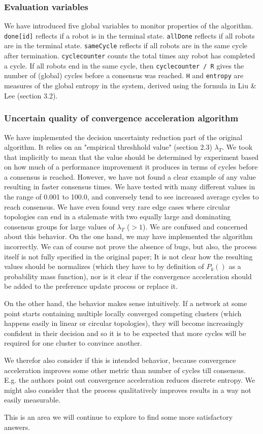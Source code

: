 \subsubsection{Evaluation variables}

We have introduced five global variables to monitor properties of the algorithm.
\texttt{done[id]} reflects if a robot is in the terminal state. \texttt{allDone} reflects if all robots are in the terminal state. \texttt{sameCycle} reflects if all robots are in the same cycle after termination. \texttt{cyclecounter} counts the total times any robot has completed a cycle. If all robots end in the same cycle, then \texttt{cyclecounter / R} gives the number of (global) cycles before a consensus was reached.
\texttt{H} and \texttt{entropy} are measures of the global entropy in the system, derived using the formula in Liu \& Lee (section 3.2).

\subsubsection{Uncertain quality of convergence acceleration algorithm}

We have implemented the decision uncertainty reduction part of the original algorithm.
It relies on an "empirical threshhold value" (section 2.3) $\lambda_T$.
We took that implicitly to mean that the value should be determined by experiment based on how much of a performance improvement it produces in terms of cycles before a consensus is reached. However, we have not found a clear example of any value resulting in faster consensus times. We have tested with many different values in the range of 0.001 to 100.0, and conversely tend to see increased average cycles to reach consensus. We have even found very rare edge cases where circular topologies can end in a stalemate with two equally large and dominating consensus groups for large values of $\lambda_T$ ($>1$).
We are confused and concerned about this behavior. On the one hand, we may have implemented the algorithm incorrectly. We can of course not prove the absence of bugs, but also, the process itself is not fully specified in the original paper; It is not clear how the resulting values should be normalizes (which they have to by definition of $P_k()$ as a probability mass function), nor is it clear if the convergence acceleration should be added to the preference update process or replace it.

On the other hand, the behavior makes sense intuitively. If a network at some point starts containing multiple locally converged competing clusters (which happens easily in linear or circular topologies), they will become increasingly confident in their decision and so it is to be expected that more cycles will be required for one cluster to convince another.

We therefor also consider if this is intended behavior, because convergence acceleration improves some other metric than number of cycles till consensus. E.g. the authors point out convergence acceleration reduces discrete entropy. We might also consider that the process qualitatively improves results in a way not easily measurable.

This is an area we will continue to explore to find some more satisfactory answers.